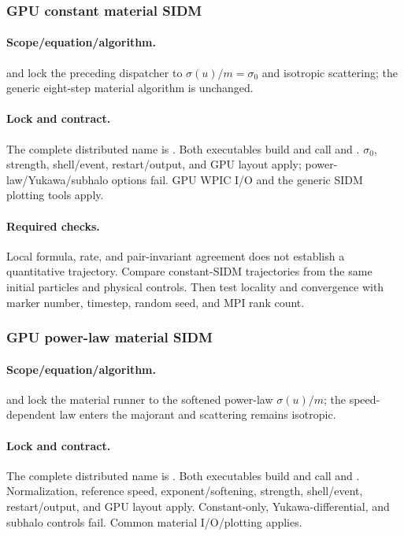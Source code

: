 \subsubsection{GPU constant material SIDM}
\paragraph{Scope/equation/algorithm.}
 and  lock the preceding dispatcher
to \(\sigma(u)/m=\sigma_0\) and isotropic scattering; the generic eight-step
material algorithm is unchanged.
\paragraph{Lock and contract.}
The complete distributed name is .  Both
executables build  and call
 and
.
\(\sigma_0\), strength, shell/event, restart/output, and GPU layout apply;
power-law/Yukawa/subhalo options fail.  GPU WPIC I/O and the generic SIDM plotting tools apply.
\paragraph{Required checks.}
Local formula, rate, and pair-invariant agreement does not establish a
quantitative trajectory.  Compare constant-SIDM trajectories from the same initial particles and
physical controls. Then test locality and convergence with marker number,
timestep, random seed, and MPI rank count.

\subsubsection{GPU power-law material SIDM}
\paragraph{Scope/equation/algorithm.}
 and  lock the material runner to
the softened power-law \(\sigma(u)/m\); the speed-dependent law enters the
majorant and scattering remains isotropic.
\paragraph{Lock and contract.}
The complete distributed name is .  Both
executables build  and call
 and
.
Normalization, reference speed, exponent/softening, strength, shell/event,
restart/output, and GPU layout apply.  Constant-only, Yukawa-differential, and
subhalo controls fail.  Common material I/O/plotting applies.
